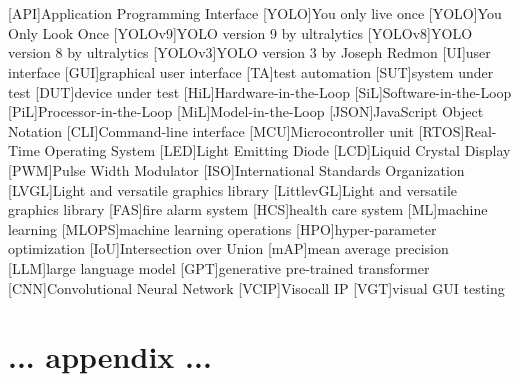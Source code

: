 \documentclass[Bachelor, BIC, english, fhCitStyle, IEEE]{BASE/twbook} %
\begin{document}
\listoftables %
\clearpage

\listoflistings %
\clearpage

{}
\chapter*{\listacroname}
\begin{acronym}
    [API]{Application Programming Interface}
    [YOLO]{You only live once}
    [YOLO]{You Only Look Once}
    [YOLOv9]{YOLO version 9 by ultralytics}
    [YOLOv8]{YOLO version 8 by ultralytics}
    [YOLOv3]{YOLO version 3 by Joseph Redmon}
    [UI]{user interface} [GUI]{graphical user interface}
    [TA]{test automation} [SUT]{system under test}
    [DUT]{device under test} [HiL]{Hardware-in-the-Loop}
    [SiL]{Software-in-the-Loop} [PiL]{Processor-in-the-Loop}
    [MiL]{Model-in-the-Loop}
    [JSON]{JavaScript Object Notation}
    [CLI]{Command-line interface}
    [MCU]{Microcontroller unit}
    [RTOS]{Real-Time Operating System}
    [LED]{Light Emitting Diode}
    [LCD]{Liquid Crystal Display}
    [PWM]{Pulse Width Modulator}
    [ISO]{International Standards Organization}
    [LVGL]{Light and versatile graphics library}
    [LittlevGL]{Light and versatile graphics library}
    [FAS]{fire alarm system}
    [HCS]{health care system}
    [ML]{machine learning}
    [MLOPS]{machine learning operations}
    [HPO]{hyper-parameter optimization}
    [IoU]{Intersection over Union}
    [mAP]{mean average precision}
    [LLM]{large language model}
    [GPT]{generative pre-trained transformer}
    [CNN]{Convolutional Neural Network}
    [VCIP]{Visocall IP}
    [VGT]{visual GUI testing}
\end{acronym}
\clearpage
\appendix
\chapter{... appendix ...}
\clearpage
\end{document}
